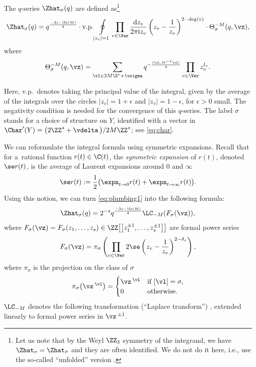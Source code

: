 \documentclass[10pt,a4paper]{amsart}
\begin{document}
The $q$-series $\Zhat_{\sigma} (q)$ are defined as\footnote{Let us note that by the Weyl $\ZZ_2$ symmetry of the integrand, we have $\Zhat_{\sigma} = \Zhat_{\bar{\sigma}}$ and they are often identified. We do not do it here, i.e., use the so-called ``unfolded'' version \cite{CCFGH18}.}
%
\begin{equation}\label{eq:plumbing1}
	\Zhat_{\sigma} (q) = q^{\frac{-3s-\Tr(M)}{4}} \cdot \text{v.p.} \oint\limits_{|z_v| = 1} \prod_{v\in \Ver} \frac{{\rm d}z_v}{2\pi{\rm i} z_v}\left( z_v - \frac{1}{z_v} \right)^{2-\deg(v)} \cdot \Theta_{\sigma}^{-M}(q, \vz),
\end{equation}
%
where
%
\[%
	\Theta_{\sigma}^{-M}(q, \vz) = \sum_{\vl \in 2M\Z^s + \vsigma} q^{-\frac{(\vl, M^{-1}\vl)}{4}} \prod_{ v\in \Ver} z_v^{l_v}.
\]

Here, v.p.\ denotes taking the principal value of the integral, given by the average of the
integrals over the circles $|z_v| = 1 + \epsilon$ and $|z_v| = 1 - \epsilon$, for $\epsilon > 0$ small. The negativity condition is needed for the convergence of this $q$-series. The label $\sigma$ stands for a choice of {\spc} structure on $Y$, identified with a vector in $\Char'(Y) = \bigl(2\ZZ^s+\vdelta\,\bigr)/2M\ZZ^s$; see \eqref{eq:char}.

We can reformulate the integral formula using symmetric expansions. Recall that for a~rational function
$r(t) \in \C(t)$, the \emph{symmetric expansion} of $r(t)$, denoted $\se r(t)$, is the average of Laurent expansions around $0$ and $\infty$
\[
	\se r(t) := \frac12 \bigl(\expn_{t\rightarrow 0} r(t) + \expn_{t \rightarrow \infty} r(t)\bigr).
\]
Using this notion, we can turn \eqref{eq:plumbing1} into the following formula:
\[%
	\Zhat_\sigma(q) =
	2^{-s} q^{\frac{-3s-\Tr(M)}{4}} \LC_{-M}(F_\sigma(\vz )),
\]
where $F_\sigma(\vz ) = F_\sigma(z_1,\dots,z_s) \in \ZZ\big[\big[z_1^{\pm 1}, \dots, z_s^{\pm 1}\big]\big]$ are formal power series
\begin{equation}\label{eq:zhat_expansion}
	F_{\sigma}(\vz )=
	\pi_\sigma \left( \prod_{v \in \Ver} 2 \se \left(z_v-\frac{1}{z_v}\right)^{2-\delta_v} \right),
\end{equation}
where $\pi_\sigma$ is the projection on the class of $\sigma$
\[
	\pi_\sigma \bigl(\vz\,{}^{\vl}\bigr) =
	\begin{cases}
		\vz\,{} ^{\vl} & \text{if } [\vl ] = \sigma, \\
		0 & \text{otherwise}.
	\end{cases}
\]
$\LC_{-M}$ denotes the following transformation (``Laplace transform'')
,
extended linearly to formal power series in $\vz\,{}^{\pm 1}$.
\end{document}
